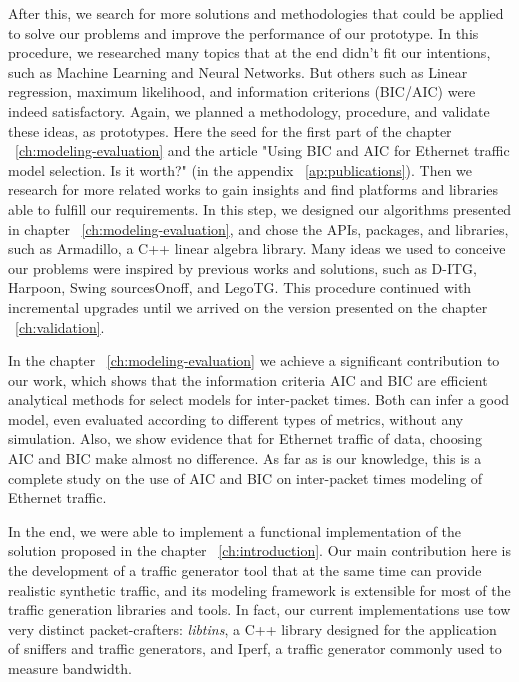 After this, we search for more solutions and methodologies that could be applied to solve our problems and improve the performance of our prototype. In this procedure, we researched many topics that at the end didn't fit our intentions, such as Machine Learning and Neural Networks. But others such as Linear regression, maximum likelihood, and information criterions (BIC/AIC) were indeed satisfactory. Again, we planned a methodology, procedure, and validate these ideas, as prototypes. Here the seed for the first part of the chapter ~\ref{ch:modeling-evaluation} and the article "Using BIC and AIC for Ethernet traffic model selection. Is it worth?" (in the appendix ~\ref{ap:publications}). Then we research for more related works to gain insights and find platforms and libraries able to fulfill our requirements. In this step, we designed our algorithms presented in chapter ~\ref{ch:modeling-evaluation}, and chose the APIs, packages, and libraries, such as Armadillo\cite{armadillo}, a C++ linear algebra library. Many ideas we used to conceive our problems were inspired by previous works and solutions, such as D-ITG\cite{ditg-paper}, Harpoon\cite{harpoon-validation}, Swing\cite{swing-paper} sourcesOnoff\cite{sourcesonoff-paper}, and LegoTG\cite{legotg-paper}. This procedure continued with incremental upgrades until we arrived on the version presented on the chapter ~\ref{ch:validation}. 


In the chapter ~\ref{ch:modeling-evaluation} we achieve a significant contribution to our work, which shows that the information criteria AIC and BIC are efficient analytical methods for select models for inter-packet times. Both can infer a good model, even evaluated according to different types of metrics, without any simulation. Also, we show evidence that for Ethernet traffic of data, choosing AIC and BIC make almost no difference. As far as is our knowledge, this is a complete study on the use of AIC and BIC on inter-packet times modeling of Ethernet traffic.


In the end, we were able to implement a functional implementation of the solution proposed in the chapter ~\ref{ch:introduction}. Our main contribution here is the development of a traffic generator tool that at the same time can provide realistic synthetic traffic, and its modeling framework is extensible for most of the traffic generation libraries and tools. In fact, our current implementations use tow very distinct packet-crafters: \textit{libtins}, a C++ library designed for the application of sniffers and traffic generators, and Iperf, a traffic generator commonly used to measure bandwidth. 


